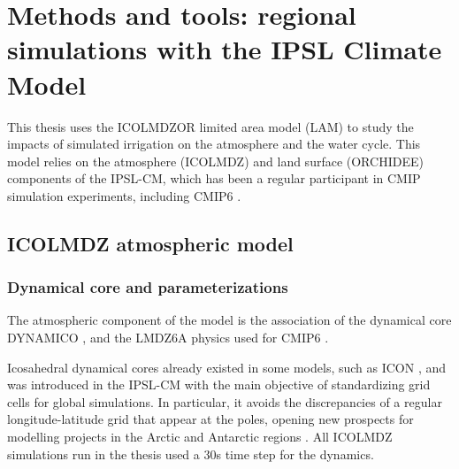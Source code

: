 \chapter{Methods and tools: regional simulations with the IPSL Climate Model}
\label{chap:methods}
\minitoc
\pagebreak

This thesis uses the ICOLMDZOR limited area model (LAM) to study the impacts of simulated irrigation on the atmosphere and the water cycle. This model relies on the atmosphere (ICOLMDZ) and land surface (ORCHIDEE) components of the IPSL-CM, which has been a regular participant in CMIP simulation experiments, including CMIP6 \citep{boucher_presentation_2020}. 

\section{ICOLMDZ atmospheric model}
\subsection{Dynamical core and parameterizations}
The atmospheric component of the model is the association of the dynamical core DYNAMICO \citep{dubos_dynamico-10_2015}, and the LMDZ6A physics used for CMIP6 \citep{hourdin_lmdz6a_2020}. 

Icosahedral dynamical cores already existed in some models, such as ICON \citep{zangl_icon_2015,giorgetta_icon-_2018,prill_icon_2022}, and was introduced in the IPSL-CM with the main objective of standardizing grid cells for global simulations. In particular, it avoids the discrepancies of a regular longitude-latitude grid that appear at the poles, opening new prospects for modelling projects in the Arctic \citep{raillard_leveraging_2024} and Antarctic regions \citep{wiener_extensive_2025}.
All ICOLMDZ simulations run in the thesis used a 30s time step for the dynamics.

